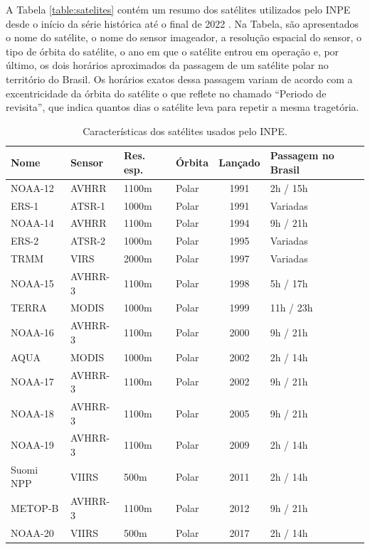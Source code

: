 \documentclass[cic,tc]{iiufrgs}
\begin{document}
A Tabela \ref{table:satelites} contém um resumo dos satélites utilizados pelo INPE desde o início da série histórica até o final de 2022 \cite{EmbrapaSatelites}. Na Tabela, são apresentados o nome do satélite, o nome do sensor imageador, a resolução espacial do sensor, o tipo de órbita do satélite, o ano em que o satélite entrou em operação e, por último, os dois horários aproximados da passagem de um satélite polar no território do Brasil. Os horários exatos dessa passagem variam de acordo com a excentricidade da órbita do satélite o que reflete no chamado ``Periodo de revisita'', que indica quantos dias o satélite leva para repetir a mesma tragetória.

\begin{table}[htbp]
\centering
\caption{Características dos satélites usados pelo INPE.}
\begin{tabular}{ @{}llllcl@{} }
  \toprule
  \textbf{Nome}    & \textbf{Sensor} & \textbf{Res. esp.} & \textbf{Órbita} & \textbf{Lançado} & \textbf{Passagem no Brasil} \\
  \midrule
  NOAA-12 & AVHRR    & 1100m       & Polar   & 1991 & 2h / 15h \\
  ERS-1   & ATSR-1   & 1000m       & Polar   & 1991 & Variadas \\
  NOAA-14 & AVHRR    & 1100m       & Polar   & 1994 & 9h / 21h \\
  ERS-2   & ATSR-2   & 1000m       & Polar   & 1995 & Variadas \\
  TRMM    & VIRS     & 2000m       & Polar   & 1997 & Variadas \\
  NOAA-15 & AVHRR-3  & 1100m       & Polar   & 1998 & 5h / 17h \\
  TERRA   & MODIS    & 1000m       & Polar   & 1999 & 11h / 23h \\
  NOAA-16 & AVHRR-3  & 1100m       & Polar   & 2000 & 9h / 21h \\
  AQUA    & MODIS    & 1000m       & Polar   & 2002 & 2h / 14h \\
  NOAA-17 & AVHRR-3  & 1100m       & Polar   & 2002 & 9h / 21h \\
  NOAA-18 & AVHRR-3  & 1100m       & Polar   & 2005 & 9h / 21h \\
  NOAA-19 & AVHRR-3  & 1100m       & Polar   & 2009 & 2h / 14h \\
  Suomi NPP & VIIRS  & 500m        & Polar   & 2011 & 2h / 14h \\
  METOP-B & AVHRR-3  & 1100m       & Polar   & 2012 & 9h / 21h \\
  NOAA-20 & VIIRS    & 500m        & Polar   & 2017 & 2h / 14h \\

\end{tabular}
\end{table}
\end{document}
